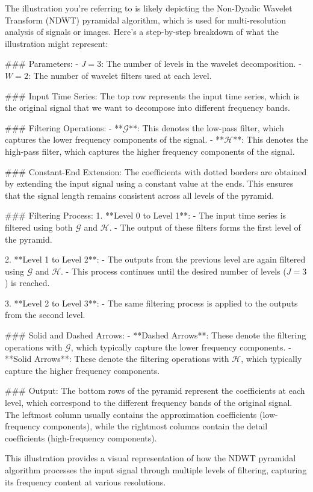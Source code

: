 The illustration you're referring to is likely depicting the Non-Dyadic Wavelet Transform (NDWT) pyramidal algorithm, which is used for multi-resolution analysis of signals or images. Here's a step-by-step breakdown of what the illustration might represent:

### Parameters:
- \( J = 3 \): The number of levels in the wavelet decomposition.
- \( W = 2 \): The number of wavelet filters used at each level.

### Input Time Series:
The top row represents the input time series, which is the original signal that we want to decompose into different frequency bands.

### Filtering Operations:
- **\(\mathcal{G}\)**: This denotes the low-pass filter, which captures the lower frequency components of the signal.
- **\(\mathcal{H}\)**: This denotes the high-pass filter, which captures the higher frequency components of the signal.

### Constant-End Extension:
The coefficients with dotted borders are obtained by extending the input signal using a constant value at the ends. This ensures that the signal length remains consistent across all levels of the pyramid.

### Filtering Process:
1. **Level 0 to Level 1**:
   - The input time series is filtered using both \(\mathcal{G}\) and \(\mathcal{H}\).
   - The output of these filters forms the first level of the pyramid.
   
2. **Level 1 to Level 2**:
   - The outputs from the previous level are again filtered using \(\mathcal{G}\) and \(\mathcal{H}\).
   - This process continues until the desired number of levels (\( J = 3 \)) is reached.

3. **Level 2 to Level 3**:
   - The same filtering process is applied to the outputs from the second level.

### Solid and Dashed Arrows:
- **Dashed Arrows**: These denote the filtering operations with \(\mathcal{G}\), which typically capture the lower frequency components.
- **Solid Arrows**: These denote the filtering operations with \(\mathcal{H}\), which typically capture the higher frequency components.

### Output:
The bottom rows of the pyramid represent the coefficients at each level, which correspond to the different frequency bands of the original signal. The leftmost column usually contains the approximation coefficients (low-frequency components), while the rightmost columns contain the detail coefficients (high-frequency components).

This illustration provides a visual representation of how the NDWT pyramidal algorithm processes the input signal through multiple levels of filtering, capturing its frequency content at various resolutions.